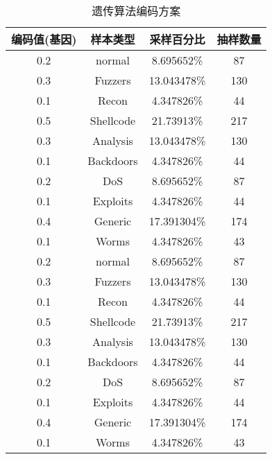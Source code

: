\begin{table}[h]
	\caption{遗传算法编码方案}
	\label{tab:Ga_code}
	\centering
	\begin{tabular}{cccc}
		\toprule
		\textbf{编码值(基因)} & \textbf{样本类型} & \textbf{采样百分比} & \textbf{抽样数量} \\
		\midrule
		0.2                   & normal            & 8.695652\%          & 87                \\
		0.3                   & Fuzzers           & 13.043478\%         & 130               \\
		0.1                   & Recon             & 4.347826\%          & 44                \\
		0.5                   & Shellcode         & 21.73913\%          & 217               \\
		0.3                   & Analysis          & 13.043478\%         & 130               \\
		0.1                   & Backdoors         & 4.347826\%          & 44                \\
		0.2                   & DoS               & 8.695652\%          & 87                \\
		0.1                   & Exploits          & 4.347826\%          & 44                \\
		0.4                   & Generic           & 17.391304\%         & 174               \\
		0.1                   & Worms             & 4.347826\%          & 43                \\
		0.2                   & normal            & 8.695652\%          & 87                \\
		0.3                   & Fuzzers           & 13.043478\%         & 130               \\
		0.1                   & Recon             & 4.347826\%          & 44                \\
		0.5                   & Shellcode         & 21.73913\%          & 217               \\
		0.3                   & Analysis          & 13.043478\%         & 130               \\
		0.1                   & Backdoors         & 4.347826\%          & 44                \\
		0.2                   & DoS               & 8.695652\%          & 87                \\
		0.1                   & Exploits          & 4.347826\%          & 44                \\
		0.4                   & Generic           & 17.391304\%         & 174               \\
		0.1                   & Worms             & 4.347826\%          & 43                \\
		\bottomrule
	\end{tabular}
\end{table}

